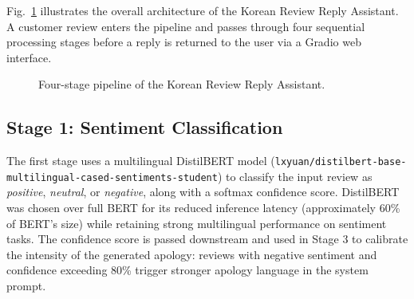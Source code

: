 \documentclass[conference]{IEEEtran}
\begin{document}
Fig.~\ref{fig:pipeline} illustrates the overall architecture of the
Korean Review Reply Assistant.
A customer review enters the pipeline and passes through four sequential
processing stages before a reply is returned to the user via a Gradio
web interface.

\begin{figure}[t]
\centering
\setlength{\fboxsep}{8pt}
\caption{Four-stage pipeline of the Korean Review Reply Assistant.}
\label{fig:pipeline}
\end{figure}

\subsection{Stage 1: Sentiment Classification}

The first stage uses a multilingual DistilBERT model
(\texttt{lxyuan/distilbert-base-\allowbreak{}multilingual-cased-\allowbreak{}sentiments-student})
to classify the input review as \textit{positive}, \textit{neutral},
or \textit{negative}, along with a softmax confidence score.
DistilBERT was chosen over full BERT for its reduced inference latency
(approximately 60\% of BERT's size) while retaining strong multilingual
performance on sentiment tasks.
The confidence score is passed downstream and used in Stage 3 to
calibrate the intensity of the generated apology: reviews with negative
sentiment and confidence exceeding 80\% trigger stronger apology
language in the system prompt.
\end{document}
